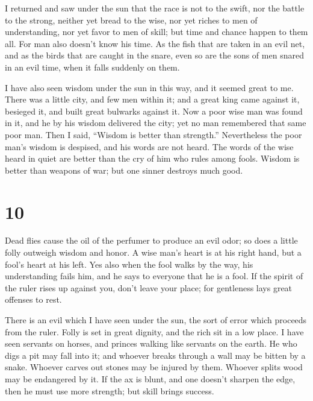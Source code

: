  I returned and saw under the sun that the race is not to
the swift, nor the battle to the strong, neither yet bread to the wise,
nor yet riches to men of understanding, nor yet favor to men of skill;
but time and chance happen to them all.  For man also
doesn't know his time. As the fish that are taken in an evil net, and as
the birds that are caught in the snare, even so are the sons of men
snared in an evil time, when it falls suddenly on them.

 I have also seen wisdom under the sun in this way, and it
seemed great to me.  There was a little city, and few men
within it; and a great king came against it, besieged it, and built
great bulwarks against it.  Now a poor wise man was found
in it, and he by his wisdom delivered the city; yet no man remembered
that same poor man.  Then I said, ``Wisdom is better than
strength.'' Nevertheless the poor man's wisdom is despised, and his
words are not heard.  The words of the wise heard in quiet
are better than the cry of him who rules among fools. 
Wisdom is better than weapons of war; but one sinner destroys much good.

\hypertarget{section-9}{%
\section{10}\label{section-9}}

 Dead flies cause the oil of the perfumer to produce an evil
odor; so does a little folly outweigh wisdom and honor.  A
wise man's heart is at his right hand, but a fool's heart at his left.
 Yes also when the fool walks by the way, his understanding
fails him, and he says to everyone that he is a fool.  If
the spirit of the ruler rises up against you, don't leave your place;
for gentleness lays great offenses to rest.

 There is an evil which I have seen under the sun, the sort
of error which proceeds from the ruler.  Folly is set in
great dignity, and the rich sit in a low place.  I have seen
servants on horses, and princes walking like servants on the earth.
 He who digs a pit may fall into it; and whoever breaks
through a wall may be bitten by a snake.  Whoever carves out
stones may be injured by them. Whoever splits wood may be endangered by
it.  If the ax is blunt, and one doesn't sharpen the edge,
then he must use more strength; but skill brings success.

